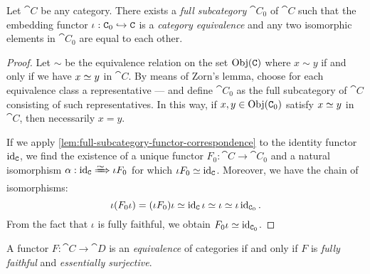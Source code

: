 \begin{lemma}
    \label{lem:full-subcategory-embedding-equivalence}
    Let \(\cat C\) be any category. There exists a \emph{full subcategory}
    \(\cat C_0\) of \(\cat C\) such that the embedding functor
    \(\iota: \texttt C_0 \hookrightarrow \texttt C\) is a \emph{category equivalence} and any two
    isomorphic elements in \(\cat C_0\) are equal to each other.
\end{lemma}

\begin{proof}
    Let \(\sim\) be the equivalence relation on the set \(\operatorname{Obj}(\texttt C)\) where
    \(x \sim y\) if and only if we have \(x \simeq y\) in \(\cat C\). By means of
    Zorn's lemma, choose for each equivalence class a representative --- and
    define \(\cat C_0\) as the full subcategory of \(\cat C\) consisting of such
    representatives. In this way, if \(x, y \in \operatorname{Obj}(\texttt C_0)\) satisfy
    \(x \simeq y\) in \(\cat C\), then necessarily \(x = y\).

    If we apply \cref{lem:full-subcategory-functor-correspondence} to the identity
    functor \(\operatorname{id}_{\texttt C}\), we find the existence of a unique functor
    \(F_0: \cat C \to \cat C_0\) and a natural isomorphism \(\alpha: \Id_{\cat C}
    \isonat \iota F_0\) for which \(\iota F_0 \simeq \operatorname{id}_{\texttt C}\). Moreover,
    we have the chain of isomorphisms:
    \[
        \iota (F_0 \iota) = (\iota F_0) \iota \simeq \operatorname{id}_{\texttt{C}} \iota \simeq \iota \simeq
        \iota \operatorname{id}_{\texttt C_0}.
    \]
    From the fact that \(\iota\) is fully faithful, we obtain \(F_0 \iota \simeq
    \operatorname{id}_{\texttt C_0}\).
\end{proof}

\begin{proposition}
    \label{prop:equiv-cats-iff-fully-faith-and-essen-surj}
    A functor \(F: \cat C \to \cat D\) is an \emph{equivalence} of categories if and
    only if \(F\) is \emph{fully faithful} and \emph{essentially surjective}.
\end{proposition}

